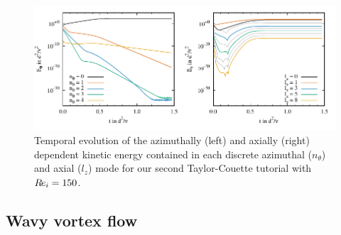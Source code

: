 \documentclass[a4paper, 11pt, DIV=11]{scrartcl}
\begin{document}
\begin{figure}[htb]
\centering
\includegraphics[scale=1.00]{figures/tc0041/keThZ.pdf}
\caption{Temporal evolution of the azimuthally (left) and axially (right)
dependent kinetic energy contained in each discrete azimuthal ($n_{\theta}$)
and axial ($l_{z}$) mode for our second Taylor-Couette tutorial 
with $R\hspace{-0.1em}e_{i}=\num{150}$.}
\label{fig:tc0041keThZ}
\end{figure}

\subsection{Wavy vortex flow}
\label{sec:tc0042}
\end{document}
